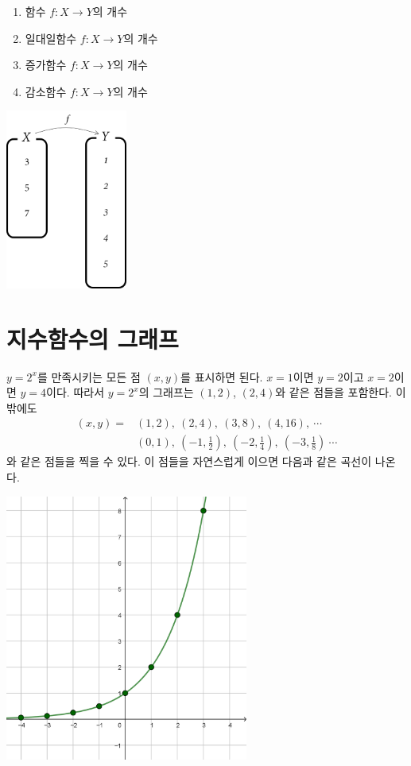 \documentclass{oblivoir}
\begin{document}
%
\begin{enumerate}\label{review9}
\item
함수 \(f:X\to Y\)의 개수
\item
일대일함수 \(f:X\to Y\)의 개수
\item
증가함수 \(f:X\to Y\)의 개수
\item
감소함수 \(f:X\to Y\)의 개수
\end{enumerate}

\begin{center}
\includegraphics[width=0.3\textwidth]{review_9}
\end{center}

\newpage
\section{지수함수의 그래프}

%
\label{exp1}
\begin{mdframed}
\(y=2^x\)를 만족시키는 모든 점 \((x,y)\)를 표시하면 된다.
\(x=1\)이면 \(y=2\)이고 \(x=2\)이면 \(y=4\)이다.
따라서 \(y=2^x\)의 그래프는 \((1,2)\), \((2,4)\)와 같은 점들을 포함한다.
이밖에도
\begin{align*}
(x,y)
=&\textstyle(1,2),\:(2,4),\:(3,8),\:(4,16),\:\cdots\\
&\textstyle(0,1),\:(-1,\frac12),\:(-2,\frac14),\:(-3,\frac18)\:\cdots
\end{align*}
와 같은 점들을 찍을 수 있다.
이 점들을 자연스럽게 이으면 다음과 같은 곡선이 나온다.
\begin{center}
\includegraphics[width=0.6\textwidth]{exp_1}
\end{center}
\end{mdframed}
\end{document}
